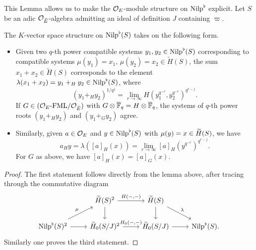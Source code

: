\documentclass[../main.tex]{subfiles}
\begin{document}
This Lemma allows us to make the $\cO_E$-module structure on $\Nilp^\flat$
explicit. Let $S$ be an adic $\cO_\br E$-algebra admitting an ideal of definition $J$ 
containing $\varpi$. 

\begin{lem}\label{lem:GroupStructureOnNilp}
  The $K$-vector space structure on $\Nilp^\flat(S)$ takes on the following form.
  \begin{itemize}
    \item Given two $q$-th power compatible systems $y_1, y_2
      \in \Nilp^\flat(S)$ corresponding to compatible systems
      $\mu(y_1) = x_1$, $\mu(y_2) = x_2 \in \tilde H(S)$, the sum $x_1 + x_2 \in
      \tilde H(S)$ corresponds to the element $\lambda(x_1 + x_2) = y_1 +_H y_2 \in
      \Nilp^\flat(S)$, where 
      \begin{equation*}
        (y_1 +_H y_2)^{1/q^j} = \lim_{r \to \infty} H( y_1^{q^{-r}},
        y_2^{q^{-r}})^{q^{r-j}}.
      \end{equation*}
      If $G \in \FMLOver {\cO_E}{\cO_\br E}$ with $G \otimes \Fqbar = H \otimes \Fqbar$,
      the systems of $q$-th power roots $(y_1 +_H y_2)$ and $(y_1 +_G y_2)$ agree. 
    \item Similarly, given $a \in \cO_E$ and $y \in \Nilp^\flat(S)$ with
      $\mu(y) = x \in \Tilde H(S)$, we have 
      \begin{equation*}
        a_H y = \lambda([a]_H(x)) = \lim_{r \to \infty} [a]_H(y^{q^{-r}})^{q^{r-j}}.
      \end{equation*}
      For $G$ as above, we have $[a]_H(x) = [a]_G(x)$. 
  \end{itemize}
\begin{proof}
  The first statement follows directly from the lemma above, after tracing
  through the commutative diagram
  \begin{equation*}
    \begin{tikzcd}[ampersand replacement=\&]
    	\& {\Tilde H(S)^2} \& {\Tilde H(S)} \\
    	{\Nilp^\flat(S)^2} \& {\Tilde H_0(S/J)^2} \& {\Tilde H_0(S/J)} \& {\Nilp^\flat(S).}
    	\arrow["{H(-,-)}", from=1-2, to=1-3]
    	\arrow[ from=1-2, to=2-2]
    	\arrow[ from=1-3, to=2-3]
    	\arrow["\lambda", from=1-3, to=2-4]
    	\arrow["\mu", from=2-1, to=1-2]
    	\arrow[ from=2-1, to=2-2]
    	\arrow["{H_0(-,-)}", from=2-2, to=2-3]
    	\arrow[from=2-3, to=2-4]
    \end{tikzcd}
  \end{equation*}
  Similarly one proves the third statement.
\end{proof}
\end{lem}
\end{document}
